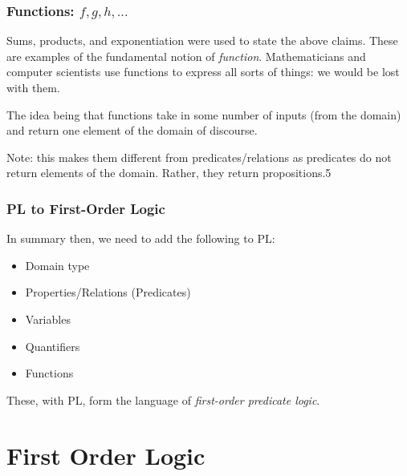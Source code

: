 \documentclass{beamer}
\theoremstyle{indentDefn} \newtheorem{defn}[]{Definition}
\begin{document}
\begin{frame}
	\frametitle{Functions: $f,g,h,...$}
	
	Sums, products, and exponentiation were used to state the above claims. These are examples of the fundamental notion of \emph{function}. Mathematicians and computer scientists use functions to express all sorts of things: we would be lost with them. 
	
	\vspace{0.3cm}
	
	The idea being that functions take in some number of inputs (from the domain) and return one element of the domain of discourse. 
	
	\vspace{0.3cm} 
	
	Note: this makes them different from predicates/relations as predicates do not return elements of the domain. Rather, they return propositions.5

	\vspace{0.3cm}

\end{frame}

\begin{frame}
	\frametitle{PL to First-Order Logic}
	
	In summary then, we need to add the following to PL: 
	
	\begin{itemize}
		\item Domain type
		\item Properties/Relations (Predicates)
		\item Variables
		\item Quantifiers
		\item Functions
	\end{itemize}
	
	These, with PL, form the language of \emph{first-order predicate logic}. 
	
	\vspace{0.2cm} 
	
\end{frame}

\section{First Order Logic}
\end{document}
